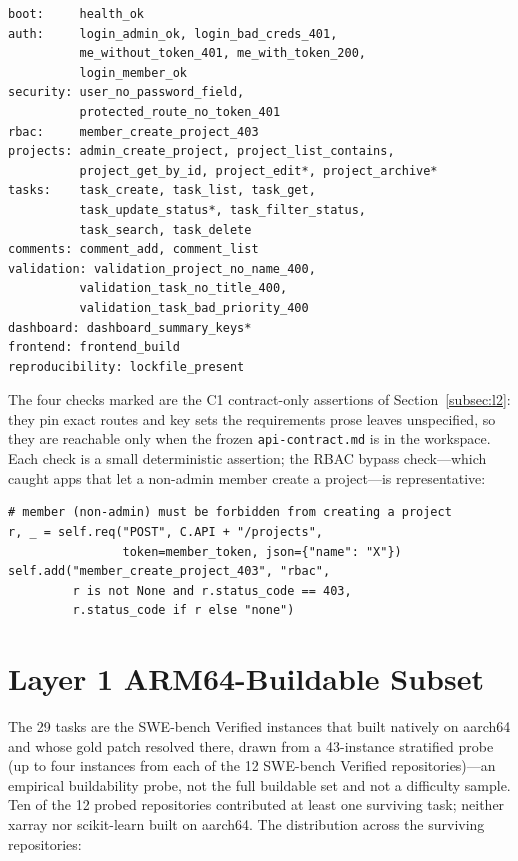 \documentclass[10pt,twocolumn]{article}
\newcommand{\code}[1]{\texttt{\small #1}}
\begin{document}
\begin{lstlisting}
boot:     health_ok
auth:     login_admin_ok, login_bad_creds_401,
          me_without_token_401, me_with_token_200,
          login_member_ok
security: user_no_password_field,
          protected_route_no_token_401
rbac:     member_create_project_403
projects: admin_create_project, project_list_contains,
          project_get_by_id, project_edit*, project_archive*
tasks:    task_create, task_list, task_get,
          task_update_status*, task_filter_status,
          task_search, task_delete
comments: comment_add, comment_list
validation: validation_project_no_name_400,
          validation_task_no_title_400,
          validation_task_bad_priority_400
dashboard: dashboard_summary_keys*
frontend: frontend_build
reproducibility: lockfile_present
\end{lstlisting}

The four checks marked \code{*} are the C1 contract-only assertions of Section~\ref{subsec:l2}: they pin
exact routes and key sets the requirements prose leaves unspecified, so they are reachable only
when the frozen \code{api-contract.md} is in the workspace. Each check is a small deterministic
assertion; the RBAC bypass check---which caught apps that let a non-admin member create a
project---is representative:

\begin{lstlisting}
# member (non-admin) must be forbidden from creating a project
r, _ = self.req("POST", C.API + "/projects",
                token=member_token, json={"name": "X"})
self.add("member_create_project_403", "rbac",
         r is not None and r.status_code == 403,
         r.status_code if r else "none")
\end{lstlisting}

\section{Layer 1 ARM64-Buildable Subset}
\label{app:subset}

The 29 tasks are the SWE-bench Verified instances that built natively on aarch64 and whose gold
patch resolved there, drawn from a 43-instance stratified probe (up to four instances from each
of the 12 SWE-bench Verified repositories)---an empirical buildability probe, not the full
buildable set and not a difficulty sample. Ten of the 12 probed repositories contributed at least
one surviving task; neither xarray nor scikit-learn built on aarch64. The distribution across the
surviving repositories:
\end{document}
